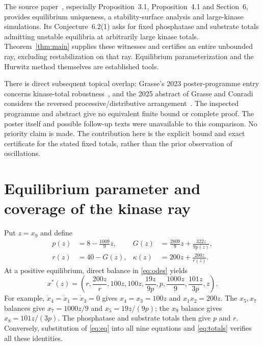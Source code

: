\documentclass[11pt]{article}
\begin{document}
The source paper~\cite{CMS}, especially Proposition~3.1, Proposition~4.1 and
Section~6, provides equilibrium uniqueness, a stability-surface analysis and
large-kinase simulations. Its Conjecture~6.2(1) asks for fixed phosphatase and
substrate totals admitting unstable equilibria at arbitrarily large kinase
totals. Theorem~\ref{thm:main} supplies these witnesses and certifies an entire
unbounded ray, excluding restabilization on that ray. Equilibrium
parameterization and the Hurwitz method themselves are established tools.

There is direct subsequent topical overlap: Grasse's 2023 poster-programme
entry concerns kinase-total robustness~\cite{Grasse2023}, and the 2025 abstract
of Grasse and Conradi considers the reversed processive/distributive
arrangement~\cite{GC2025}. The inspected programme and abstract give no
equivalent finite bound or complete proof. The poster itself and possible
follow-up texts were unavailable to this comparison. No priority claim is
made. The contribution here is the explicit bound and exact certificate for
the stated fixed totals, rather than the prior observation of oscillations.

\section{Equilibrium parameter and coverage of the kinase ray}

Put $z=x_9$ and define
\begin{equation}\label{eq:param}
\begin{aligned}
 p(z)&=8-\frac{1009}{9}z,&
 G(z)&=\frac{2809}{9}z+\frac{322z}{9p(z)},\\
 r(z)&=40-G(z),&
 \kappa(z)&=200z+\frac{200z}{r(z)}.
\end{aligned}
\end{equation}
At a positive equilibrium, direct balance in \eqref{eq:odes} yields
\begin{equation}\label{eq:eq}
 x^*(z)=\left(r,\frac{200z}{r},100z,100z,
       \frac{19z}{9p},p,\frac{1000z}{9},\frac{101z}{3p},z\right).
\end{equation}
For example, $\dot x_4=\dot x_1=\dot x_3=0$ gives
$x_4=x_3=100z$ and $x_1x_2=200z$.
The $x_5,x_7$ balances give $x_7=1000z/9$ and
$x_5=19z/(9p)$; the $x_9$ balance gives $x_8=101z/(3p)$.
The phosphatase and substrate totals then give $p$ and $r$.
Conversely, substitution of \eqref{eq:eq} into all nine equations and
\eqref{eq:totals} verifies all these identities.
\end{document}
